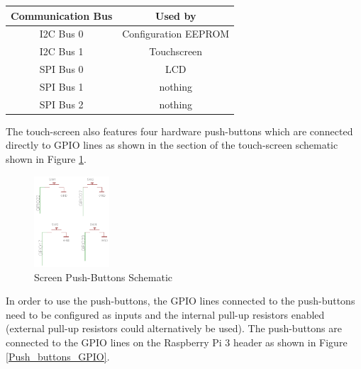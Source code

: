 \documentclass{article}
\begin{document}
	\begin{table}
		\centering
		
		\begin{tabular}[H]{| c | c |}
			\hline
			\textbf{Communication Bus} & \textbf{Used by} \\
			\hline
			I2C Bus 0 & Configuration EEPROM \\
			\hline
			I2C Bus 1 & Touchscreen \\
			\hline
			SPI Bus 0 & LCD \\
			\hline
			SPI Bus 1 & nothing \\
			\hline
			SPI Bus 2 & nothing \\
			\hline
		\end{tabular}
	\end{table}


The touch-screen also features four hardware push-buttons which are connected directly to GPIO lines as shown in the section of the touch-screen schematic shown in Figure \ref{Push_buttons_schematic}.


	\begin{figure}[H]
		\centering
		\includegraphics[width=0.25\textwidth]{pics/PiTFT_2-8_push-buttons_section_schematic.png}
		\caption{Screen Push-Buttons Schematic}
		\label{Push_buttons_schematic}
	\end{figure}


In order to use the push-buttons, the GPIO lines connected to the push-buttons need to be configured as inputs and the internal pull-up resistors enabled (external pull-up resistors could alternatively be used). The push-buttons are connected to the GPIO lines on the Raspberry Pi 3 header as shown in Figure \ref{Push_buttons_GPIO}.
\end{document}
